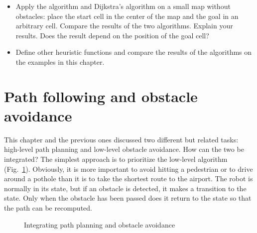 \begin{framed}
\begin{itemize}
\item Apply the \astar{} algorithm and Dijkstra's algorithm on a small map without obstacles: place the start cell in the center of the map and the goal in an arbitrary cell. Compare the results of the two algorithms. Explain your results. Does the result depend on the position of the goal cell?
\item Define other heuristic functions and compare the results of the \astar{} algorithms on the examples in this chapter.
\end{itemize}
\end{framed}

\section{Path following and obstacle avoidance}\label{s.path-and-obstacle}

This chapter and the previous ones discussed two different but related tasks: high-level path planning and low-level obstacle avoidance. How can the two be integrated? The simplest approach is to prioritize the low-level algorithm (Fig.~\ref{fig.integrate-pp}). Obviously, it is more important to avoid hitting a pedestrian or to drive around a pothole than it is to take the shortest route to the airport. The robot is normally in its  state, but if an obstacle is detected, it makes a transition to the  state. Only when the obstacle has been passed does it return to the state  so that the path can be recomputed.

\begin{figure}
\begin{center}
\caption{Integrating path planning and obstacle avoidance}\label{fig.integrate-pp}
\end{center}
\end{figure}

